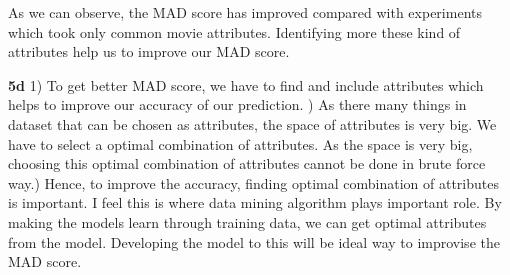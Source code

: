 \documentclass{article}
\begin{document}
As we can observe, the MAD score has improved compared with experiments which took only common movie attributes. Identifying more these kind of attributes help us to improve our MAD score.\newline

\textbf{5d}
1) To get better MAD score, we have to find and include attributes which helps to improve our accuracy of our prediction. ) As there many things in dataset that can be chosen as attributes, the space of attributes is very big. We have to select a optimal combination of attributes. As the space is very big, choosing this optimal combination of attributes cannot be done in brute force way.) Hence, to improve the accuracy, finding optimal combination of attributes is important. I feel this is where data mining algorithm plays important role. By making the models learn through training data, we can get optimal attributes from the model. Developing the model to this will be ideal way to improvise the MAD score.\newline
\end{document}

